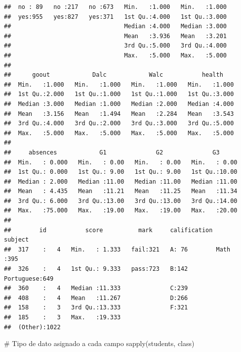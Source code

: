 \documentclass[]{article}
\newenvironment{Shaded}{\begin{snugshade}}{\end{snugshade}}
\newcommand{\CommentTok}[1]{\textcolor[rgb]{0.50,0.62,0.50}{#1}}
\newcommand{\KeywordTok}[1]{\textcolor[rgb]{0.94,0.87,0.69}{#1}}
\newcommand{\NormalTok}[1]{\textcolor[rgb]{0.80,0.80,0.80}{#1}}
\begin{document}
\begin{verbatim}
##  no : 89   no :217   no :673   Min.   :1.000   Min.   :1.000  
##  yes:955   yes:827   yes:371   1st Qu.:4.000   1st Qu.:3.000  
##                                Median :4.000   Median :3.000  
##                                Mean   :3.936   Mean   :3.201  
##                                3rd Qu.:5.000   3rd Qu.:4.000  
##                                Max.   :5.000   Max.   :5.000  
##                                                               
##      goout            Dalc            Walc           health     
##  Min.   :1.000   Min.   :1.000   Min.   :1.000   Min.   :1.000  
##  1st Qu.:2.000   1st Qu.:1.000   1st Qu.:1.000   1st Qu.:3.000  
##  Median :3.000   Median :1.000   Median :2.000   Median :4.000  
##  Mean   :3.156   Mean   :1.494   Mean   :2.284   Mean   :3.543  
##  3rd Qu.:4.000   3rd Qu.:2.000   3rd Qu.:3.000   3rd Qu.:5.000  
##  Max.   :5.000   Max.   :5.000   Max.   :5.000   Max.   :5.000  
##                                                                 
##     absences            G1              G2              G3       
##  Min.   : 0.000   Min.   : 0.00   Min.   : 0.00   Min.   : 0.00  
##  1st Qu.: 0.000   1st Qu.: 9.00   1st Qu.: 9.00   1st Qu.:10.00  
##  Median : 2.000   Median :11.00   Median :11.00   Median :11.00  
##  Mean   : 4.435   Mean   :11.21   Mean   :11.25   Mean   :11.34  
##  3rd Qu.: 6.000   3rd Qu.:13.00   3rd Qu.:13.00   3rd Qu.:14.00  
##  Max.   :75.000   Max.   :19.00   Max.   :19.00   Max.   :20.00  
##                                                                  
##        id           score          mark     calification       subject   
##  317    :   4   Min.   : 1.333   fail:321   A: 76        Math      :395  
##  326    :   4   1st Qu.: 9.333   pass:723   B:142        Portuguese:649  
##  360    :   4   Median :11.333              C:239                        
##  408    :   4   Mean   :11.267              D:266                        
##  158    :   3   3rd Qu.:13.333              F:321                        
##  185    :   3   Max.   :19.333                                           
##  (Other):1022
\end{verbatim}

\begin{Shaded}
\begin{Highlighting}[]
\CommentTok{# Tipo de dato asignado a cada campo}
\KeywordTok{sapply}\NormalTok{(students, class)}
\end{Highlighting}
\end{Shaded}
\end{document}
